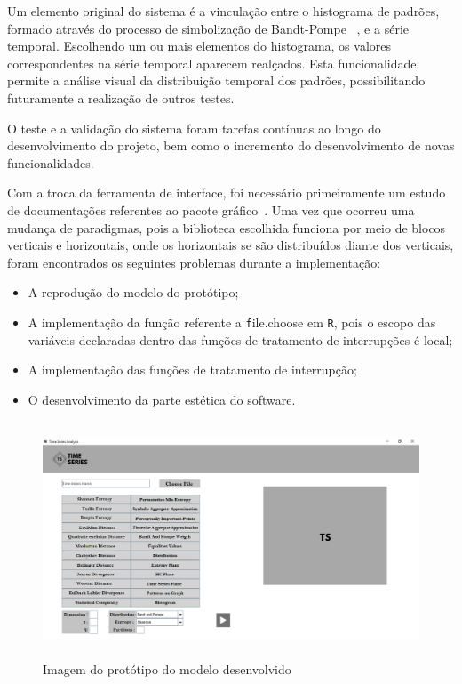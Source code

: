 Um elemento original do sistema é a vinculação entre o histograma de padrões, formado através do processo de simbolização de Bandt-Pompe ~\citep{Bandt2002Permutation}, e a série temporal. 
Escolhendo um ou mais elementos do histograma, os valores correspondentes na série temporal aparecem realçados. 
Esta funcionalidade permite a análise visual da distribuição temporal dos padrões, possibilitando futuramente a realização de outros testes.
 
O teste e a validação do sistema foram tarefas contínuas ao longo do desenvolvimento do projeto, bem como o incremento do desenvolvimento de novas funcionalidades. 

Com a troca da ferramenta de interface, foi necessário primeiramente um estudo de documentações referentes ao pacote gráfico~\citep{rgtk2}. 
Uma vez que ocorreu uma mudança de paradigmas, pois a biblioteca escolhida funciona por meio de blocos verticais e horizontais, onde os horizontais se são distribuídos diante dos verticais, foram encontrados os seguintes problemas durante a implementação:

\begin{itemize}
\item A reprodução do modelo do protótipo;
\item A implementação da função referente a \texttt file.choose em \texttt R, pois o escopo das variáveis declaradas dentro das funções de tratamento de interrupções é local;
\item A implementação das funções de tratamento de interrupção;
\item O desenvolvimento da parte estética do software.
\end{itemize}

\begin{figure}
  \centering
  \caption{Imagem do protótipo do modelo desenvolvido}
   \includegraphics[width=15cm,height=7cm]{capitulos/imagens/tela4.png}
\end{figure}

